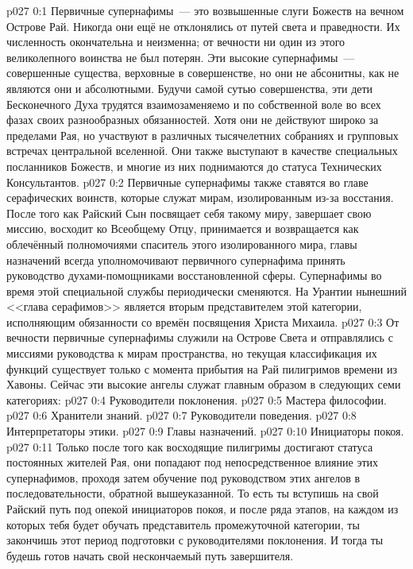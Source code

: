 \author{Совершенствователь Мудрости}
\vs p027 0:1 Первичные супернафимы~--- это возвышенные слуги Божеств на вечном Острове Рай. Никогда они ещё не отклонялись от путей света и праведности. Их численность окончательна и неизменна; от вечности ни один из этого великолепного воинства не был потерян. Эти высокие супернафимы~--- совершенные существа, верховные в совершенстве, но они не абсонитны, как не являются они и абсолютными. Будучи самой сутью совершенства, эти дети Бесконечного Духа трудятся взаимозаменяемо и по собственной воле во всех фазах своих разнообразных обязанностей. Хотя они не действуют широко за пределами Рая, но участвуют в различных тысячелетних собраниях и групповых встречах центральной вселенной. Они также выступают в качестве специальных посланников Божеств, и многие из них поднимаются до статуса Технических Консультантов.
\vs p027 0:2 Первичные супернафимы также ставятся во главе серафических воинств, которые служат мирам, изолированным из\hyp{}за восстания. После того как Райский Сын посвящает себя такому миру, завершает свою миссию, восходит ко Всеобщему Отцу, принимается и возвращается как облечённый полномочиями спаситель этого изолированного мира, главы назначений всегда уполномочивают первичного супернафима принять руководство духами\hyp{}помощниками восстановленной сферы. Супернафимы во время этой специальной службы периодически сменяются. На Урантии нынешний <<глава серафимов>> является вторым представителем этой категории, исполняющим обязанности со времён посвящения Христа Михаила.
\vs p027 0:3 От вечности первичные супернафимы служили на Острове Света и отправлялись с миссиями руководства к мирам пространства, но текущая классификация их функций существует только с момента прибытия на Рай пилигримов времени из Хавоны. Сейчас эти высокие ангелы служат главным образом в следующих семи категориях:
\vs p027 0:4 Руководители поклонения.
\vs p027 0:5 Мастера философии.
\vs p027 0:6 Хранители знаний.
\vs p027 0:7 Руководители поведения.
\vs p027 0:8 Интерпретаторы этики.
\vs p027 0:9 Главы назначений.
\vs p027 0:10 Инициаторы покоя.
\vs p027 0:11 Только после того как восходящие пилигримы достигают статуса постоянных жителей Рая, они попадают под непосредственное влияние этих супернафимов, проходя затем обучение под руководством этих ангелов в последовательности, обратной вышеуказанной. То есть ты вступишь на свой Райский путь под опекой инициаторов покоя, и после ряда этапов, на каждом из которых тебя будет обучать представитель промежуточной категории, ты закончишь этот период подготовки с руководителями поклонения. И тогда ты будешь готов начать свой нескончаемый путь завершителя.
